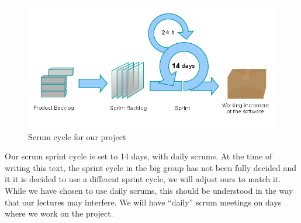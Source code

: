 \begin{figure}[h]
	\centering
		\includegraphics[width=1.00\textwidth]{scrumcycle.png}
	 \caption{Scrum cycle for our project}
         \label{fig:scrumcycle}
\end{figure}

Our scrum sprint cycle is set to 14 days, with daily scrums. At the time of writing this text, the sprint cycle in the big group has not been fully decided and it it is decided to use a different
sprint cycle, we will adjust ours to match it. While we have chosen to use daily scrums, this should be understood in the way that our lectures may interfere. We will have ``daily'' scrum meetings
on days where we work  on the project. 



